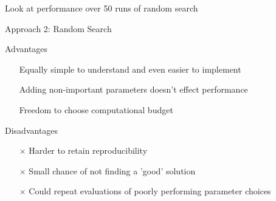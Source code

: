 \documentclass{beamer}
\begin{document}
\begin{frame}
		\begin{block}{}
		Look at performance over 50 runs of random search
		
		\begin{figure}[h]
			\begin{center}
			\end{center}
		\end{figure}
	\end{block}
\end{frame}

\begin{frame}{Approach 2: Random Search}
	\begin{block}{Advantages}
	\begin{itemize}
		\item[\checkmark] Equally simple to understand and even easier to implement
		\item[\checkmark] Adding non-important parameters doesn't effect performance
		\item[\checkmark] Freedom to choose computational budget
	\end{itemize}
\end{block}
\begin{block}{Disadvantages}
	\begin{itemize}
		\item[$\times$] Harder to retain reproducibility
		\item[$\times$] Small chance of not finding a 'good' solution
		\item[$\times$] Could repeat evaluations of poorly performing parameter choices
	\end{itemize}
\end{block}
\end{frame}
\end{document}
